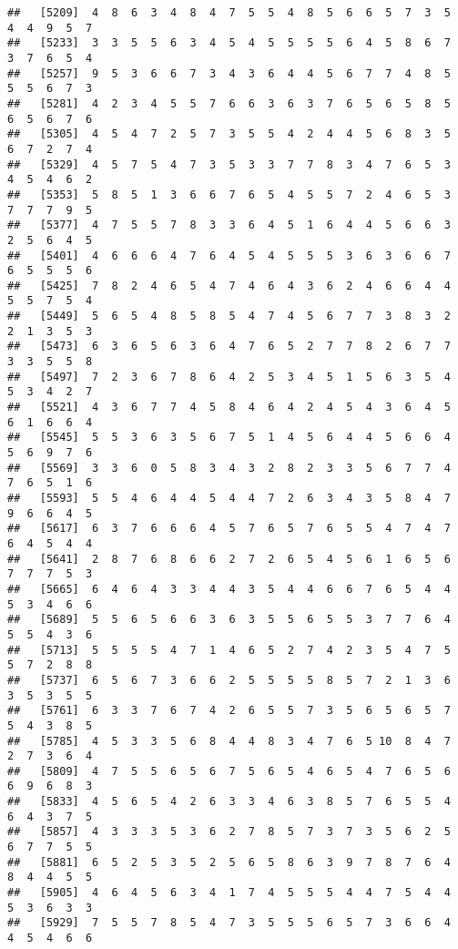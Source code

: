 \documentclass[
]{book}
\begin{document}
\begin{verbatim}
##   [5209]  4  8  6  3  4  8  4  7  5  5  4  8  5  6  6  5  7  3  5  4  4  9  5  7
##   [5233]  3  3  5  5  6  3  4  5  4  5  5  5  5  6  4  5  8  6  7  3  7  6  5  4
##   [5257]  9  5  3  6  6  7  3  4  3  6  4  4  5  6  7  7  4  8  5  5  5  6  7  3
##   [5281]  4  2  3  4  5  5  7  6  6  3  6  3  7  6  5  6  5  8  5  6  5  6  7  6
##   [5305]  4  5  4  7  2  5  7  3  5  5  4  2  4  4  5  6  8  3  5  6  7  2  7  4
##   [5329]  4  5  7  5  4  7  3  5  3  3  7  7  8  3  4  7  6  5  3  4  5  4  6  2
##   [5353]  5  8  5  1  3  6  6  7  6  5  4  5  5  7  2  4  6  5  3  7  7  7  9  5
##   [5377]  4  7  5  5  7  8  3  3  6  4  5  1  6  4  4  5  6  6  3  2  5  6  4  5
##   [5401]  4  6  6  6  4  7  6  4  5  4  5  5  5  3  6  3  6  6  7  6  5  5  5  6
##   [5425]  7  8  2  4  6  5  4  7  4  6  4  3  6  2  4  6  6  4  4  5  5  7  5  4
##   [5449]  5  6  5  4  8  5  8  5  4  7  4  5  6  7  7  3  8  3  2  2  1  3  5  3
##   [5473]  6  3  6  5  6  3  6  4  7  6  5  2  7  7  8  2  6  7  7  3  3  5  5  8
##   [5497]  7  2  3  6  7  8  6  4  2  5  3  4  5  1  5  6  3  5  4  5  3  4  2  7
##   [5521]  4  3  6  7  7  4  5  8  4  6  4  2  4  5  4  3  6  4  5  6  1  6  6  4
##   [5545]  5  5  3  6  3  5  6  7  5  1  4  5  6  4  4  5  6  6  4  5  6  9  7  6
##   [5569]  3  3  6  0  5  8  3  4  3  2  8  2  3  3  5  6  7  7  4  7  6  5  1  6
##   [5593]  5  5  4  6  4  4  5  4  4  7  2  6  3  4  3  5  8  4  7  9  6  6  4  5
##   [5617]  6  3  7  6  6  6  4  5  7  6  5  7  6  5  5  4  7  4  7  6  4  5  4  4
##   [5641]  2  8  7  6  8  6  6  2  7  2  6  5  4  5  6  1  6  5  6  7  7  7  5  3
##   [5665]  6  4  6  4  3  3  4  4  3  5  4  4  6  6  7  6  5  4  4  5  3  4  6  6
##   [5689]  5  5  6  5  6  6  3  6  3  5  5  6  5  5  3  7  7  6  4  5  5  4  3  6
##   [5713]  5  5  5  5  4  7  1  4  6  5  2  7  4  2  3  5  4  7  5  5  7  2  8  8
##   [5737]  6  5  6  7  3  6  6  2  5  5  5  5  8  5  7  2  1  3  6  3  5  3  5  5
##   [5761]  6  3  3  7  6  7  4  2  6  5  5  7  3  5  6  5  6  5  7  5  4  3  8  5
##   [5785]  4  5  3  3  5  6  8  4  4  8  3  4  7  6  5 10  8  4  7  2  7  3  6  4
##   [5809]  4  7  5  5  6  5  6  7  5  6  5  4  6  5  4  7  6  5  6  6  9  6  8  3
##   [5833]  4  5  6  5  4  2  6  3  3  4  6  3  8  5  7  6  5  5  4  6  4  3  7  5
##   [5857]  4  3  3  3  5  3  6  2  7  8  5  7  3  7  3  5  6  2  5  6  7  7  5  5
##   [5881]  6  5  2  5  3  5  2  5  6  5  8  6  3  9  7  8  7  6  4  8  4  4  5  5
##   [5905]  4  6  4  5  6  3  4  1  7  4  5  5  5  4  4  7  5  4  4  5  3  6  3  3
##   [5929]  7  5  5  7  8  5  4  7  3  5  5  5  6  5  7  3  6  6  4  4  5  4  6  6

\end{verbatim}
\end{document}
